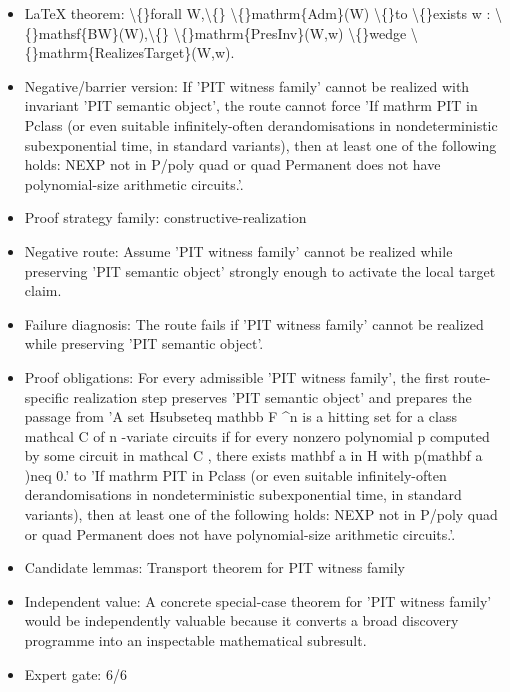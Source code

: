 \documentclass[11pt]{article}
\begin{document}
\begin{itemize}
\item LaTeX theorem: \textbackslash\{\}forall W,\textbackslash\{\} \textbackslash\{\}mathrm\{Adm\}(W) \textbackslash\{\}to \textbackslash\{\}exists w : \textbackslash\{\}mathsf\{BW\}(W),\textbackslash\{\} \textbackslash\{\}mathrm\{PresInv\}(W,w) \textbackslash\{\}wedge \textbackslash\{\}mathrm\{RealizesTarget\}(W,w).
\item Negative/barrier version: If 'PIT witness family' cannot be realized with invariant 'PIT semantic object', the route cannot force 'If mathrm PIT in Pclass (or even suitable infinitely-often derandomisations in nondeterministic subexponential time, in standard variants), then at least one of the following holds: NEXP not in P/poly quad or quad Permanent does not have polynomial-size arithmetic circuits.'.
\item Proof strategy family: constructive-realization
\item Negative route: Assume 'PIT witness family' cannot be realized while preserving 'PIT semantic object' strongly enough to activate the local target claim.
\item Failure diagnosis: The route fails if 'PIT witness family' cannot be realized while preserving 'PIT semantic object'.
\item Proof obligations: For every admissible 'PIT witness family', the first route-specific realization step preserves 'PIT semantic object' and prepares the passage from 'A set Hsubseteq mathbb F \textasciicircum{}n is a hitting set for a class mathcal C of n -variate circuits if for every nonzero polynomial p computed by some circuit in mathcal C , there exists mathbf a in H with p(mathbf a )neq 0.' to 'If mathrm PIT in Pclass (or even suitable infinitely-often derandomisations in nondeterministic subexponential time, in standard variants), then at least one of the following holds: NEXP not in P/poly quad or quad Permanent does not have polynomial-size arithmetic circuits.'.
\item Candidate lemmas: Transport theorem for PIT witness family
\item Independent value: A concrete special-case theorem for 'PIT witness family' would be independently valuable because it converts a broad discovery programme into an inspectable mathematical subresult.
\item Expert gate: 6/6
\end{itemize}
\end{document}
